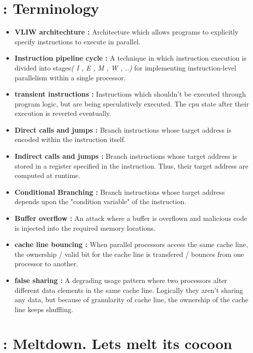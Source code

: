 \documentclass[12pt]{article}
\begin{document}
\begin{appendices}
	\section{: Terminology}
	\begin{itemize}
		\item \textbf{VLIW architechture : } Architecture which allows programs to explicitly specify instructions to execute in parallel. 
		\item \textbf{Instruction pipeline cycle : }  A technique in which instruction execution is divided into stages\textit{( I , E , M , W , ..)} for implementing instruction-level parallelism within a single processor. 
		\item \textbf{transient instructions : } Instructions which shouldn't be executed through program logic, but are being speculatively executed. The cpu state after their execution is reverted eventually.  
		\item \textbf{Direct calls and jumps : } Branch instructions whose target address is encoded within the instruction itself.
		\item \textbf{Indirect calls and jumps : } Branch instructions whose target address is stored in a register specified in the instruction. Thus, their target address are computed at runtime.
		\item \textbf{Conditional Branching : } Branch instructions whose target address depends upon the "condition variable" of the instruction.
		\item \textbf{Buffer overflow : }  An attack where a buffer is overflown and malicious code is injected into the required memory locations.
		\item \textbf{cache line bouncing : } When parallel processors access the same cache line, the ownership / valid bit for the cache line is transfered / bounces from one processor to another.
		\item \textbf{false sharing : }	 A degrading usage pattern where two processors alter different data elements in the same cache line. Logically they aren't sharing any data, but because of granularity of cache line, the ownership of the cache line keeps shuffling.
	\end{itemize}
	\section{: Meltdown. Lets melt its cocoon}
	

\end{appendices}
\end{document}
